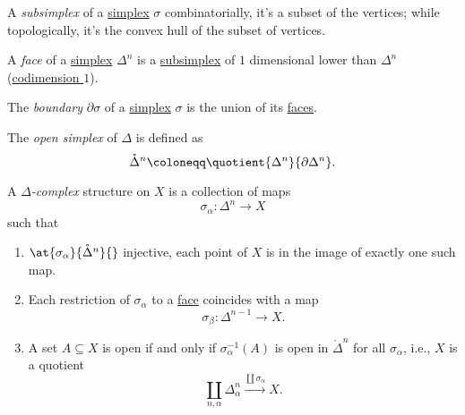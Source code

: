 \begin{definition}[Subsimplex]\label{def:subsimplex}
	A \emph{subsimplex} of a \hyperref[def:standard-simplex]{simplex} \(\sigma \) combinatorially, it's a
	subset of the vertices; while topologically, it's the convex hull of the subset of vertices.
	\begin{figure}[H]
		\centering
		\label{fig:def:subsimplex}
	\end{figure}
\end{definition}

\begin{definition}[Face]\label{def:face}
	A \emph{face} of a \hyperref[def:standard-simplex]{simplex} \(\Delta ^n\) is a \hyperref[def:subsimplex]{subsimplex} of \(1\) dimensional lower
	than \(\Delta ^n\) (\underline{codimension \(1\)}).
\end{definition}

\begin{definition}[Boundary]\label{def:boundary}
	The \emph{boundary} \(\partial \sigma \) of a \hyperref[def:standard-simplex]{simplex} \(\sigma \) is the union of its \hyperref[def:face]{faces}.
\end{definition}

\begin{definition}\label{def:open-simplex}
	The \emph{open simplex} of \(\Delta \) is defined as
	\[
		\mathring{\Delta}^n \coloneqq \quotient{\Delta^n }{\partial \Delta^n }.
	\]
\end{definition}

\begin{definition}\label{def:delta-complex}
	A \emph{\(\Delta \)-complex} structure on \(X\) is a collection of maps
	\[
		\sigma _\alpha \colon \Delta ^n\to X
	\]
	such that
	\begin{enumerate}
		\item \(\at{\sigma _\alpha }{\mathring{\Delta}^n}{}\) injective, each point of \(X\) is in the image of exactly one such map.
		\item Each restriction of \(\sigma _\alpha \) to a \hyperref[def:face]{face} coincides with a map
		      \[
			      \sigma _\beta \colon \Delta^{n-1} \to X.
		      \]
		\item A set \(A\subseteq X\) is open if and only if \(\sigma ^{-1} _\alpha (A)\) is open in \(\mathring{\Delta }^n\) for all
		      \(\sigma _\alpha \), i.e., \(X\) is a quotient
		      \[
			      \coprod\limits_{n, \alpha }\Delta ^n_\alpha \overset{\coprod \sigma _\alpha}{\longrightarrow} X.
		      \]
	\end{enumerate}
\end{definition}

